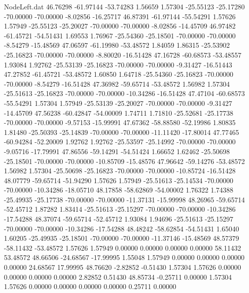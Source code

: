 \begin{filecontents}{NodeLeft.dat}
  46.76298  -61.97144  -53.74283     1.56659    1.57304  -25.55123  -25.17280  -70.00000  -70.00000   -8.02856  -16.25717
  46.87391  -61.97144  -55.54291     1.57626    1.57949  -25.55123  -25.20027  -70.00000  -70.00000   -8.02856  -14.45709
  46.97482  -61.45721  -54.51431     1.69553    1.76967  -25.54360  -25.18501  -70.00000  -70.00000   -8.54279  -15.48569
  47.06597  -61.19980  -53.48572     1.84059    1.86315  -25.53902  -25.16823  -70.00000  -70.00000   -8.80020  -16.51428
  47.16728  -60.68573  -53.48557     1.93084    1.92762  -25.53139  -25.16823  -70.00000  -70.00000   -9.31427  -16.51443
  47.27852  -61.45721  -53.48572     1.60850    1.64718  -25.54360  -25.16823  -70.00000  -70.00000   -8.54279  -16.51428
  47.36982  -59.65714  -53.48572     1.56982    1.57304  -25.51613  -25.16823  -70.00000  -70.00000  -10.34286  -16.51428
  47.47104  -60.68573  -55.54291     1.57304    1.57949  -25.53139  -25.20027  -70.00000  -70.00000   -9.31427  -14.45709
  47.56238  -60.42847  -54.00009     1.74711    1.71810  -25.52681  -25.17738  -70.00000  -70.00000   -9.57153  -15.99991
  47.67362  -58.88580  -52.19986     1.80835    1.81480  -25.50393  -25.14839  -70.00000  -70.00000  -11.11420  -17.80014
  47.77465  -60.94284  -52.20009     1.92762    1.92762  -25.53597  -25.14992  -70.00000  -70.00000   -9.05716  -17.79991
  47.86556  -59.14291  -54.51424     1.66652    1.62462  -25.50698  -25.18501  -70.00000  -70.00000  -10.85709  -15.48576
  47.96642  -59.14276  -53.48572     1.56982    1.57304  -25.50698  -25.16823  -70.00000  -70.00000  -10.85724  -16.51428
  48.07779  -59.65714  -51.94290     1.57626    1.57949  -25.51613  -25.14534  -70.00000  -70.00000  -10.34286  -18.05710
  48.17858  -58.62869  -54.00002     1.76322    1.74388  -25.49935  -25.17738  -70.00000  -70.00000  -11.37131  -15.99998
  48.26965  -59.65714  -52.45712     1.87282    1.83414  -25.51613  -25.15297  -70.00000  -70.00000  -10.34286  -17.54288
  48.37074  -59.65714  -52.45712     1.93084    1.94696  -25.51613  -25.15297  -70.00000  -70.00000  -10.34286  -17.54288
  48.48242  -58.62854  -54.51431     1.65040    1.60205  -25.49935  -25.18501  -70.00000  -70.00000  -11.37146  -15.48569
  48.57379  -58.11432  -53.48572     1.57626    1.57949    0.00000    0.00000    0.00000    0.00000   58.11432   53.48572
  48.66506  -24.68567  -17.99995     1.55048    1.57949    0.00000    0.00000    0.00000    0.00000   24.68567   17.99995
  48.76620   -2.82852   -0.51430     1.57304    1.57626    0.00000    0.00000    0.00000    0.00000    2.82852    0.51430
  48.85734   -0.25711    0.00000     1.57304    1.57626    0.00000    0.00000    0.00000    0.00000    0.25711    0.00000

\end{filecontents}

